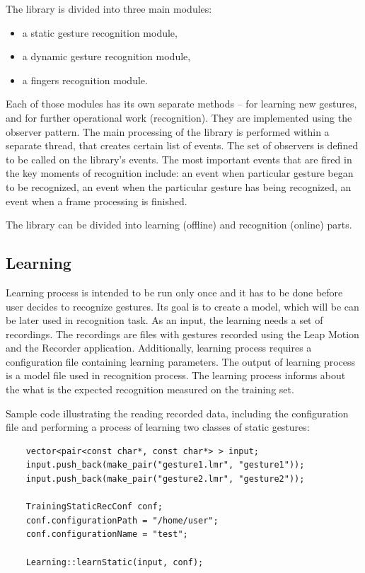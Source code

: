 The library is divided into three main modules:
\begin{itemize}
\item a static gesture recognition module,
\item a dynamic gesture recognition module,
\item a fingers recognition module.
\end{itemize}

Each of those modules has its own separate methods -- for learning new gestures, and for further operational work (recognition). They are implemented using the observer pattern. 
The main processing of the library is performed within a separate thread, that creates certain list of events.
The set of observers is defined to be called on the library's events.
The most important events that are fired in the key moments of recognition include: an event when particular gesture began to be recognized, an event when the particular gesture has being recognized, an event when a frame processing is finished.

The library can be divided into learning (offline) and recognition (online) parts.
	
\subsection{Learning}

Learning process is intended to be run only once and it has to be done before user decides to recognize gestures. Its goal is to create a model, which will be can be later used in recognition task. As an input, the learning needs a set of recordings. The recordings are files with gestures recorded using the Leap Motion and the Recorder application. Additionally, learning process requires a configuration file containing learning parameters. The output of learning process is a model file used in recognition process. 
The learning process informs about the what is the expected recognition measured on the training set.

Sample code illustrating the reading recorded data, including the configuration file and performing a process of learning two classes of static gestures:
\begin{lstlisting}
	vector<pair<const char*, const char*> > input;
	input.push_back(make_pair("gesture1.lmr", "gesture1"));
	input.push_back(make_pair("gesture2.lmr", "gesture2"));

	TrainingStaticRecConf conf;
	conf.configurationPath = "/home/user";
	conf.configurationName = "test";

	Learning::learnStatic(input, conf);
\end{lstlisting}


